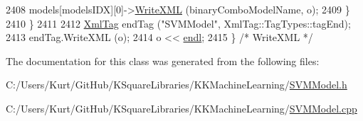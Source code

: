\begin{DoxyCode}
2408       models[modelsIDX][0]->\hyperlink{struct_s_v_m233_1_1_svm_model233_ab2d4f8e127af93158ca436d080e80f85}{WriteXML} (binaryComboModelName, o);
2409     \}
2410   \}
2411 
2412   \hyperlink{class_k_k_b_1_1_xml_tag}{XmlTag}  endTag (\textcolor{stringliteral}{"SVMModel"}, XmlTag::TagTypes::tagEnd);
2413   endTag.WriteXML (o);
2414   o << \hyperlink{namespace_k_k_b_ad1f50f65af6adc8fa9e6f62d007818a8}{endl};
2415 \}  \textcolor{comment}{/* WriteXML */}
\end{DoxyCode}


The documentation for this class was generated from the following files\+:\begin{DoxyCompactItemize}
\item 
C\+:/\+Users/\+Kurt/\+Git\+Hub/\+K\+Square\+Libraries/\+K\+K\+Machine\+Learning/\hyperlink{_s_v_m_model_8h}{S\+V\+M\+Model.\+h}\item 
C\+:/\+Users/\+Kurt/\+Git\+Hub/\+K\+Square\+Libraries/\+K\+K\+Machine\+Learning/\hyperlink{_s_v_m_model_8cpp}{S\+V\+M\+Model.\+cpp}\end{DoxyCompactItemize}
